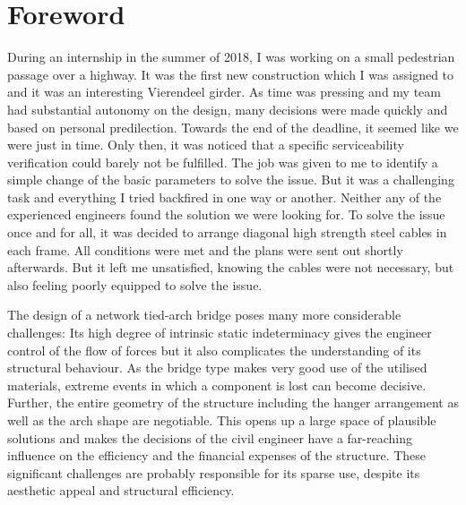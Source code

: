 \section*{Foreword}

During an internship in the summer of 2018, I was working on a small pedestrian passage over a highway. It was the first new construction which I was assigned to and it was an interesting Vierendeel girder. As time was pressing and my team had substantial autonomy on the design, many decisions were made quickly and based on personal predilection. Towards the end of the deadline, it seemed like we were just in time. Only then, it was noticed that a specific serviceability verification could barely not be fulfilled. The job was given to me to identify a simple change of the basic parameters to solve the issue. But it was a challenging task and everything I tried backfired in one way or another. Neither any of the experienced engineers found the solution we were looking for. To solve the issue once and for all, it was decided to arrange diagonal high strength steel cables in each frame. All conditions were met and the plans were sent out shortly afterwards. But it left me unsatisfied, knowing the cables were not necessary, but also feeling poorly equipped to solve the issue.\medskip

The design of a network tied-arch bridge poses many more considerable challenges: Its high degree of intrinsic static indeterminacy gives the engineer control of the flow of forces but it also complicates the understanding of its structural behaviour. As the bridge type makes very good use of the utilised materials, extreme events in which a component is lost can become decisive. Further, the entire geometry of the structure including the hanger arrangement as well as the arch shape are negotiable. This opens up a large space of plausible solutions and makes the decisions of the civil engineer have a far-reaching influence on the efficiency and the financial expenses of the structure. These significant challenges are probably responsible for its sparse use, despite its aesthetic appeal and structural efficiency. \medskip

